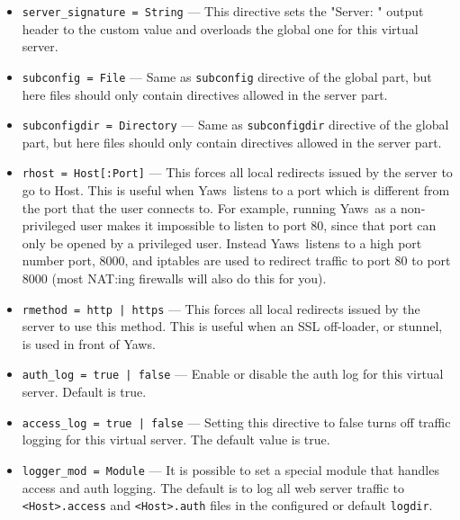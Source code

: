\documentclass[11pt,oneside,english]{book}
\newcommand{\Yaws}            %
        {{\sc Yaws}}
\begin{document}
\begin{itemize}
\item        \verb+server_signature = String+ ---
              This directive sets the "Server: " output header to the custom
              value and overloads the global one for this virtual server.

\item        \verb+subconfig = File+ ---
              Same as \verb+subconfig+ directive of the global part, but here
              files should only contain directives allowed in the server part.

\item        \verb+subconfigdir = Directory+ ---
              Same as \verb+subconfigdir+ directive of the global part, but here
              files should only contain directives allowed in the server part.

\item       \verb+rhost = Host[:Port]+ ---
             This forces all local redirects issued by the server to go to Host.
             This is useful when \Yaws\ listens to a port which is different
             from the port that the user connects to. For example, running
             \Yaws\ as a non-privileged user makes it impossible to listen to
             port 80, since that port can only be opened by a privileged
             user. Instead \Yaws\ listens to a high port number port, 8000, and
             iptables are used to redirect traffic to port 80 to port 8000 (most
             NAT:ing firewalls will also do this for you).

\item       \verb+rmethod = http | https+ ---
              This forces  all  local  redirects  issued  by  the
              server  to  use this method. This is useful when an
              SSL off-loader, or stunnel, is  used  in  front  of
              \Yaws{}.

\item       \verb+auth_log = true | false+ ---
              Enable or disable the auth log for this virtual server.
              Default is true.

\item       \verb+access_log = true | false+ ---
              Setting  this  directive  to  false turns off
              traffic logging for this virtual server. The
              default value is true.

\item       \verb+logger_mod = Module+ ---
              It is possible to set a special module that handles access and
              auth logging. The default is to log all web server traffic to
              \verb+<Host>.access+ and \verb+<Host>.auth+ files in the
              configured or default \verb+logdir+.


\end{itemize}
\end{document}
